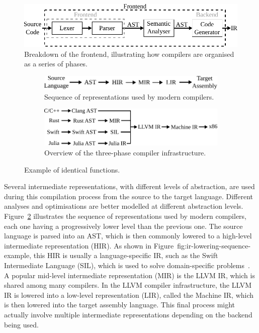 \begin{figure}[h]
  \centering
  \includegraphics[scale=0.9]{src/background/figs/compiler-frontend.pdf}
  \caption{Breakdown of the frontend, illustrating how compilers are organised as a series of phases.}
  \label{fig:compiler-frontend}
\end{figure}

\begin{figure}[h]
\centering
\begin{subfigure}{\textwidth}
\centering
  \includegraphics[scale=0.9]{src/background/figs/ir-lowering-sequence.pdf}
  \caption{Sequence of representations used by modern compilers.}
  \label{fig:ir-lowering-sequence-general}
\end{subfigure}
\begin{subfigure}{\textwidth}
\centering
  \includegraphics[scale=0.9]{src/background/figs/ir-lowering-sequence-example.pdf}
  \caption{Overview of the three-phase compiler infrastructure.}
  \label{fig:ir-lowering-sequence-example}
\end{subfigure}
\caption{Example of identical functions.}
\label{fig:ir-lowering-sequence}
\end{figure}

Several intermediate representations, with different levels of abstraction, are used during this compilation process from the source to the target language.
Different analyses and optimisations are better modelled at different abstraction levels.
Figure~\ref{fig:ir-lowering-sequence-general} illustrates the sequence of representations used by modern compilers, each one having a progressively lower level than the previous one.
The source language is parsed into an AST, which is then commonly lowered to a high-level intermediate representation (HIR).
As shown in Figure~{fig:ir-lowering-sequence-example}, this HIR is usually a language-specific IR, such as the Swift Intermediate Language (SIL), which is used to solve domain-specific problems~\cite{lattner20}.
A popular mid-level intermediate representation (MIR) is the LLVM IR, which is shared among many compilers.
In the LLVM compiler infrastructure, the LLVM IR is lowered into a low-level representation (LIR), called the Machine IR, which is then lowered into the target assembly language.
This final process might actually involve multiple intermediate representations depending on the backend being used.



